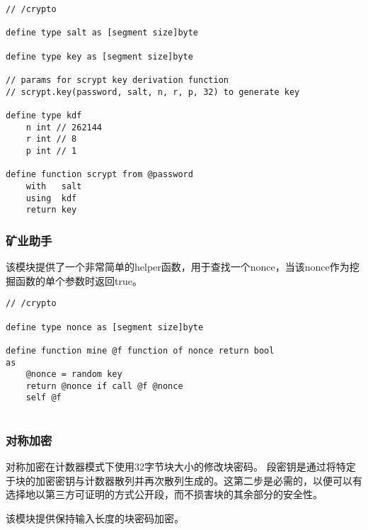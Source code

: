 \begin{definition}\label{def:scrypt}
\begin{lstlisting}[language=buzz1]
// /crypto

define type salt as [segment size]byte

define type key as [segment size]byte

// params for scrypt key derivation function
// scrypt.key(password, salt, n, r, p, 32) to generate key

define type kdf
    n int // 262144
    r int // 8
    p int // 1

define function scrypt from @password
    with   salt 
    using  kdf
    return key

\end{lstlisting}
\end{definition}  

\subsubsection{矿业助手}

该模块提供了一个非常简单的helper函数，用于查找一个nonce，当该nonce作为挖掘函数的单个参数时返回true。

\begin{definition}\label{def:mine}
\begin{lstlisting}[language=buzz1]
// /crypto

define type nonce as [segment size]byte

define function mine @f function of nonce return bool
as
    @nonce = random key
    return @nonce if call @f @nonce
    self @f
    
\end{lstlisting}
\end{definition}  

\subsubsection{对称加密}

对称加密在计数器模式下使用32字节块大小的修改块密码。
段密钥是通过将特定于块的加密密钥与计数器散列并再次散列生成的。这第二步是必需的，以便可以有选择地以第三方可证明的方式公开段，而不损害块的其余部分的安全性。

该模块提供保持输入长度的块密码加密。

